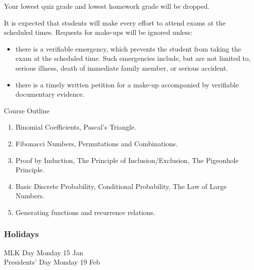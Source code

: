\documentclass[11pt]{article}
\begin{document}
Your lowest quiz grade and lowest homework grade will be dropped.

It is expected that students will make every effort to attend exams at the scheduled times. Requests for make-ups will be ignored unless:
\begin{itemize}
\item
there is a verifiable emergency, which prevents the student from taking the exam at the scheduled time. Such emergencies include, but are not limited to, serious illness, death of immediate family member, or serious accident.
\item
there is a timely written petition for a make-up accompanied by verifiable documentary evidence.
\end{itemize}

\vspace{5 mm}


{\Large \centerline{Course Outline}}
\begin{enumerate}
\item Binomial Coefficients, Pascal's Triangle.
\item Fibonacci Numbers, Permutations and Combinations.
\item Proof by Induction, The Principle of Inclusion/Exclusion, The Pigeonhole Principle.
\item Basic Discrete Probability, Conditional Probability, The Law of Large Numbers.
\item Generating functions and recurrence relations.
\end{enumerate}

\subsubsection*{Holidays}
MLK Day Monday 15 Jan \\
Presidents' Day Monday 19 Feb 
\end{document}
